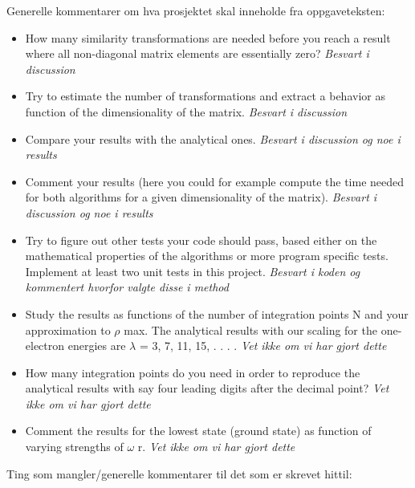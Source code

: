 \documentclass{article}
\begin{document}
Generelle kommentarer om hva prosjektet skal inneholde fra oppgaveteksten:

\begin{itemize}

  \item How many similarity transformations are needed before you reach a result
  where all non-diagonal matrix elements are essentially zero?  \textit{Besvart i discussion}

  \item Try to estimate the number of transformations and extract a behavior as function of the dimensionality of the matrix. \textit{Besvart i discussion}

  \item Compare your results with the analytical ones. \textit{Besvart i discussion og noe i results}

  \item Comment your results (here you could for example compute the time needed for both algorithms for a given dimensionality of the matrix). \textit{Besvart i discussion og noe i results}

  \item Try to figure out other tests your code should pass, based either on the mathematical properties of the algorithms or more program specific tests. Implement at least two unit tests in this project. \textit{Besvart i koden og kommentert hvorfor valgte disse i method}

  \item Study the results as functions of the number of integration points N and your approximation to $\rho$ max. The analytical results with our scaling for the one-electron energies are $\lambda$ = 3, 7, 11, 15, . . . . \textit{Vet ikke om vi har gjort dette}

  \item How many integration points do you need in order to reproduce the analytical results with say four leading digits after the decimal point?  \textit{Vet ikke om vi har gjort dette}

  \item Comment the results for the lowest state (ground state) as function of varying strengths of $ \omega$ r. \textit{Vet ikke om vi har gjort dette}

\end{itemize}

\vspace{2cm}

Ting som mangler/generelle kommentarer til det som er skrevet hittil:
\end{document}
